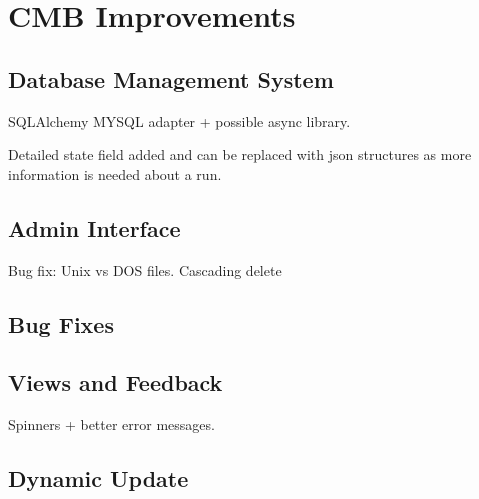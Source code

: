\chapter{CMB Improvements}

\section{Database Management System}
SQLAlchemy MYSQL adapter + possible async library.

Detailed state field added and can be replaced with json structures as more information is needed about a run.

\section{Admin Interface}
Bug fix: Unix vs DOS files.
Cascading delete

\section{Bug Fixes}

\section{Views and Feedback}
Spinners + better error messages.

\section{Dynamic Update}
